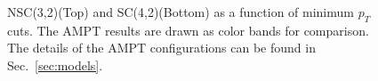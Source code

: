 \documentclass[ALICE,manyauthors]{cernphprep}
\begin{document}
\begin{figure}[htbp]
             \begin{center}
              \end{center}
             \caption{NSC(3,2)(Top) and SC(4,2)(Bottom) as a function of minimum $p_T$ cuts. The AMPT results are drawn as color bands for comparison. The details of the AMPT configurations can be found in Sec.~\ref{sec:models}.}
             \label{fig:Figure_8}
\end{figure}
  
\newpage
\end{document}
